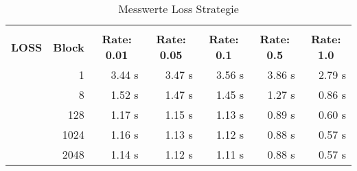 \begin{table}[!htb]

\begin{tabular}{rrrrrrr}
\hline\\
\multicolumn{0}{c}{\colorbox{myblue}{\textbf{LOSS}}} &  
\multicolumn{0}{c}{\colorbox{myblue}{\textbf{Block}}} &  
\multicolumn{0}{c}{\colorbox{myblue}{\textbf{Rate: 0.01}}} &  
\multicolumn{0}{c}{\colorbox{myblue}{\textbf{Rate: 0.05}}} & 
\multicolumn{0}{c}{\colorbox{myblue}{\textbf{Rate: 0.1}}} &
\multicolumn{0}{c}{\colorbox{myblue}{\textbf{Rate: 0.5}}} & 
\multicolumn{0}{c}{\colorbox{myblue}{\textbf{Rate: 1.0}}}\\
 & 1 & 3.44 s & 3.47 s & 3.56 s & 3.86 s & 2.79 s \\
 & 8 & 1.52 s & 1.47 s & 1.45 s & 1.27 s & 0.86 s \\
 & 128 & 1.17 s & 1.15 s & 1.13 s & 0.89 s & 0.60 s \\ 
 & 1024 & 1.16 s & 1.13 s & 1.12 s & 0.88 s & 0.57 s \\
 & 2048 & 1.14 s & 1.12 s & 1.11 s & 0.88 s & 0.57 s \\
\hline
\end{tabular}
\caption{Messwerte Loss Strategie}
\label{tblLoss}
\end{table}

